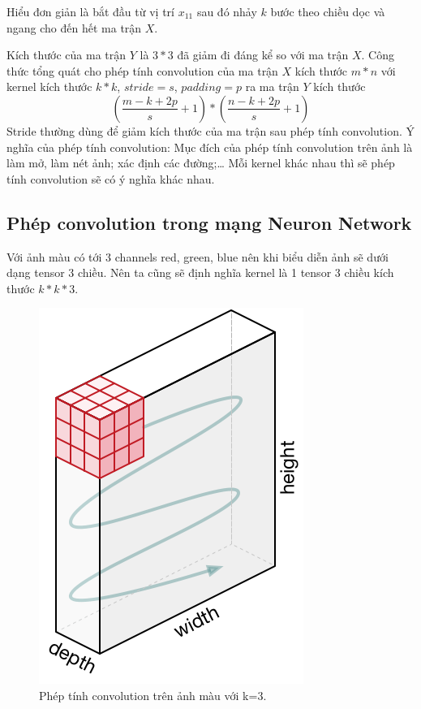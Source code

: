 \begin{itemize}
Hiểu đơn giản là bắt đầu từ vị trí $x_{11}$ sau đó nhảy $k$ bước theo chiều dọc và ngang cho đến hết ma trận $X$.

Kích thước của ma trận $Y$ là $3*3$ đã giảm đi đáng kể so với ma trận $X$.
Công thức tổng quát cho phép tính convolution của ma trận $X$ kích thước $m*n$ với kernel kích thước $k*k$, $stride = s$, $padding = p$ ra ma trận $Y$ kích thước $$(\frac{m-k+2p}{s}+1) * (\frac{n-k+2p}{s}+1)$$
Stride thường dùng để giảm kích thước của ma trận sau phép tính convolution.
Ý nghĩa của phép tính convolution:
Mục đích của phép tính convolution trên ảnh là làm mở, làm nét ảnh; xác định các đường;… Mỗi kernel khác nhau thì sẽ phép tính convolution sẽ có ý nghĩa khác nhau. 
\end{itemize} 
\subsection{Phép convolution trong mạng Neuron Network}
Với ảnh màu có tới 3 channels red, green, blue nên khi biểu diễn ảnh sẽ dưới dạng tensor 3 chiều. Nên ta cũng sẽ định nghĩa kernel là 1 tensor 3 chiều kích thước $k*k*3$.

\FloatBarrier
\begin{figure}[htp]
\begin{center}
\includegraphics[scale=0.5]{chap2/c2_figs/13.png}
\end{center}
\caption{Phép tính convolution trên ảnh màu với k=3.}
\label{fig:padding,stride}
\end{figure}
\FloatBarrier

